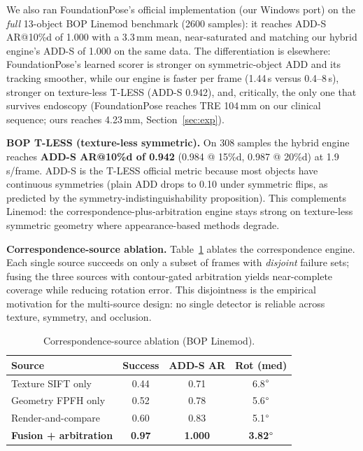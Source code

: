 \documentclass[9pt,twoside,web]{ieeecolor2}
\begin{document}
We also ran FoundationPose's official implementation (our Windows port) on the \emph{full} 13-object BOP Linemod benchmark (2600 samples): it reaches ADD-S AR@10\%d of 1.000 with a 3.3\,mm mean, near-saturated and matching our hybrid engine's ADD-S of 1.000 on the same data. The differentiation is elsewhere: FoundationPose's learned scorer is stronger on symmetric-object ADD and its tracking smoother, while our engine is faster per frame (1.44\,s versus 0.4--8\,s), stronger on texture-less T-LESS (ADD-S 0.942), and, critically, the only one that survives endoscopy (FoundationPose reaches TRE 104\,mm on our clinical sequence; ours reaches 4.23\,mm, Section~\ref{sec:exp}).

\textbf{BOP T-LESS (texture-less symmetric).} On 308 samples the hybrid engine reaches \textbf{ADD-S AR@10\%d of 0.942} (0.984 @ 15\%d, 0.987 @ 20\%d) at 1.9\,s/frame. ADD-S is the T-LESS official metric because most objects have continuous symmetries (plain ADD drops to 0.10 under symmetric flips, as predicted by the symmetry-indistinguishability proposition). This complements Linemod: the correspondence-plus-arbitration engine stays strong on texture-less symmetric geometry where appearance-based methods degrade.

\textbf{Correspondence-source ablation.} Table~\ref{tab:ablation} ablates the correspondence engine. Each single source succeeds on only a subset of frames with \emph{disjoint} failure sets; fusing the three sources with contour-gated arbitration yields near-complete coverage while reducing rotation error. This disjointness is the empirical motivation for the multi-source design: no single detector is reliable across texture, symmetry, and occlusion.

\begin{table}[t]
\centering
\caption{Correspondence-source ablation (BOP Linemod).}
\label{tab:ablation}
\begin{tabular}{lccc}
\toprule
Source & Success & ADD-S AR & Rot (med) \\
\midrule
Texture SIFT only & 0.44 & 0.71 & 6.8$\degree$ \\
Geometry FPFH only & 0.52 & 0.78 & 5.6$\degree$ \\
Render-and-compare & 0.60 & 0.83 & 5.1$\degree$ \\
\textbf{Fusion + arbitration} & \textbf{0.97} & \textbf{1.000} & \textbf{3.82}$\degree$ \\
\bottomrule
\end{tabular}
\end{table}
\end{document}
